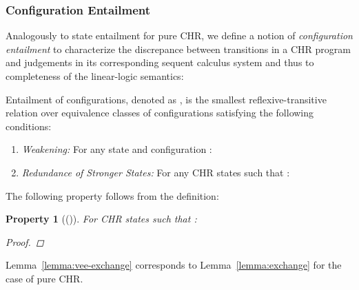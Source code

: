 \documentclass[acmtocl]{acmtrans2m}
\newtheorem{property}[theorem]{Property}
\begin{document}
\subsubsection{Configuration Entailment}

Analogously to state entailment for pure CHR, we define a notion of
\emph{configuration entailment} to characterize the discrepance between
transitions in a CHR program and judgements in its corresponding sequent
calculus system and thus to completeness of the linear-logic semantics:

\begin{definition}
\label{def:c_entail}
Entailment of configurations, denoted as , is the smallest
reflexive-transitive relation over equivalence classes of configurations satisfying
the following conditions:
  \begin{enumerate}
    \item \label{cond:cn_wea}
    \emph{Weakening:} For any state  and configuration
    :
    
    \item \label{cond:cn_stronger}
    \emph{Redundance of Stronger States:} For any CHR
      states  such that
      :
      
    \end{enumerate}
\end{definition}

The following property follows from the definition:

\begin{property}[()]
For CHR states  such that :

\begin{proof}

\end{proof}
\end{property}

Lemma~\ref{lemma:vee-exchange} corresponds to Lemma~\ref{lemma:exchange} for
the case of pure CHR.
\end{document}
